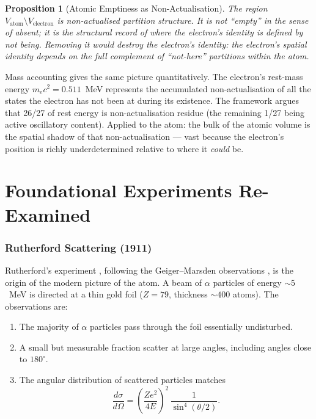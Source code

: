 \documentclass[11pt,a4paper]{article}
\newtheorem{proposition}[theorem]{Proposition}
\theoremstyle{definition}
\theoremstyle{remark}
\begin{document}
\begin{proposition}[Atomic Emptiness as Non-Actualisation]
\label{prop:emptynon}
The region $V_{\mathrm{atom}} \setminus V_{\mathrm{electron}}$ is non-actualised partition structure. It is not ``empty'' in the sense of absent; it is the structural record of \emph{where the electron's identity is defined by not being}. Removing it would destroy the electron's identity: the electron's spatial identity depends on the full complement of ``not-here'' partitions within the atom.
\end{proposition}

Mass accounting gives the same picture quantitatively. The electron's rest-mass energy $m_e c^2 = 0.511$~MeV represents the accumulated non-actualisation of all the states the electron has not been at during its existence. The framework \citep{sachikonye2025a} argues that 26/27 of rest energy is non-actualisation residue (the remaining 1/27 being active oscillatory content). Applied to the atom: the bulk of the atomic volume is the spatial shadow of that non-actualisation --- vast because the electron's position is richly underdetermined relative to where it \emph{could} be.

\part{Foundational Experiments Re-Examined}

\section{Rutherford Scattering (1911)}
\label{sec:rutherford}

Rutherford's experiment \citep{rutherford1911}, following the Geiger--Marsden observations \citep{geigermarsden1909}, is the origin of the modern picture of the atom. A beam of $\alpha$ particles of energy $\sim 5$~MeV is directed at a thin gold foil ($Z = 79$, thickness $\sim 400$ atoms). The observations are:

\begin{enumerate}
\item The majority of $\alpha$ particles pass through the foil essentially undisturbed.
\item A small but measurable fraction scatter at large angles, including angles close to $180^\circ$.
\item The angular distribution of scattered particles matches
\[
\frac{d\sigma}{d\Omega} = \left(\frac{Z e^2}{4 E}\right)^2\,\frac{1}{\sin^4(\theta/2)}.
\]
\end{enumerate}
\end{document}
